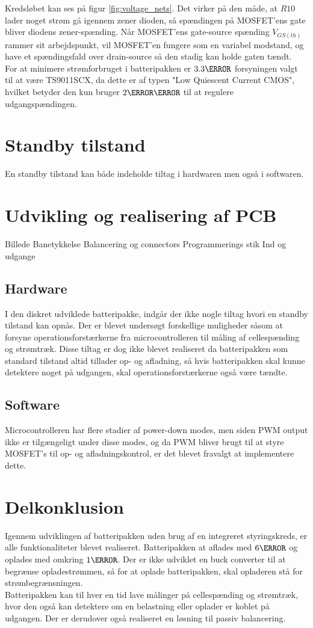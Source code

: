 Kredsløbet kan ses på figur \ref{fig:voltage_nets}. Det virker på den måde, at $R10$ lader noget strøm gå igennem zener dioden, så spændingen på MOSFET'ens gate bliver diodens zener-spænding. Når MOSFET'ens gate-source spænding $V_{GS(th)}$ rammer sit arbejdspunkt, vil MOSFET'en fungere som en variabel modstand, og have et spændingsfald over drain-source så den stadig kan holde gaten tændt.
\\

For at minimere strømforbruget i batteripakken er $3.3\volt$ forsyningen valgt til at være TS9011SCX, da dette er af typen "Low Quiescent Current CMOS", hvilket betyder den kun bruger $2\micro\ampere$ til at regulere udgangspændingen.

\section{Standby tilstand}
En standby tilstand kan både indeholde tiltag i hardwaren men også i softwaren.

\section{Udvikling og realisering af PCB}
Billede
Banetykkelse
Balancering og connectors
Programmerings stik
Ind og udgange


\subsection{Hardware}
I den diskret udviklede batteripakke, indgår der ikke nogle tiltag hvori en standby tilstand kan opnås. Der er blevet undersøgt forskellige muligheder såsom at forsyne operationsforstærkerne fra microcontrolleren til måling af cellespænding og strømtræk. Disse tiltag er dog ikke blevet realiseret da batteripakken som standard tilstand altid tillader op- og afladning, så hvis batteripakken skal kunne detektere noget på udgangen, skal operationsforstærkerne også være tændte.

\subsection{Software}
Microcontrolleren har flere stadier af power-down modes, men siden PWM output ikke er tilgængeligt under disse modes, og da PWM bliver brugt til at styre MOSFET's til op- og afladningskontrol, er det blevet fravalgt at implementere dette. 

\section{Delkonklusion}
Igennem udviklingen af batteripakken uden brug af en integreret styringskreds, er alle funktionaliteter blevet realiseret. Batteripakken at aflades med $6\ampere$ og oplades med omkring $1\ampere$. Der er ikke udviklet en buck converter til at begrænse opladestrømmen, så for at oplade batteripakken, skal opladeren stå for strømbegrænsningen.
\\

Batteripakken kan til hver en tid lave målinger på cellespænding og strømtræk, hvor den også kan detektere om en belastning eller oplader er koblet på udgangen. Der er derudover også realiseret en løsning til passiv balancering.